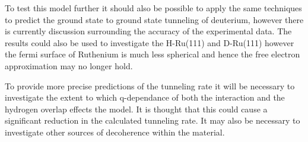 To test
this model further
it should also be possible
to apply the same
techniques
to predict the
ground state to
ground state tunneling
of deuterium, however
there is currently
discussion
surrounding the
accuracy of the
experimental data.
The results could
also be used to
investigate the
H-Ru(111) and D-Ru(111) %
however the fermi
surface of Ruthenium
is much less spherical
and hence
the free electron
approximation may
no longer hold.

To provide more precise
predictions of the
tunneling rate
it will be necessary
to investigate the
extent to which q-dependance
of both the interaction
and the hydrogen overlap
effects the model. It is thought
that this could cause a
significant reduction in
the calculated tunneling
rate. It may also be necessary
to investigate other
sources of decoherence
within the material.